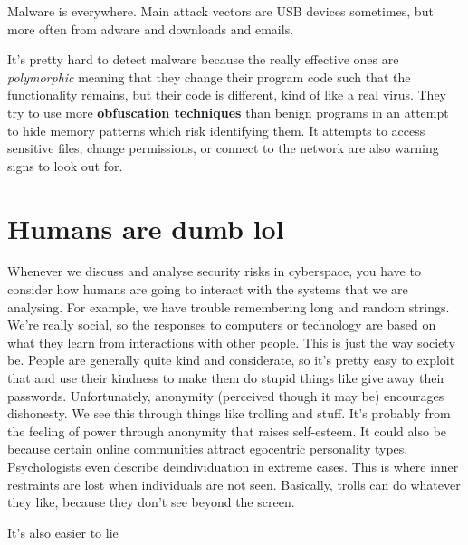 \documentclass[11pt,a4paper,titlepage]{scrartcl}
\begin{document}
Malware is everywhere. Main attack vectors are USB devices sometimes, but
more often from adware and downloads and emails.

It's pretty hard to detect malware because the really effective ones are
\textit{polymorphic} meaning that they change their program code such that
the functionality remains, but their code is different, kind of like a
real virus. They try to use more \textbf{obfuscation techniques} than
benign programs in an attempt to hide memory patterns which risk
identifying them. It attempts to access sensitive files, change
permissions, or connect to the network are also warning signs to look out
for. 

\section{Humans are dumb lol}%
\label{sec:dumb-humans}

Whenever we discuss and analyse security risks in cyberspace, you have to
consider how humans are going to interact with the systems that we are
analysing. For example, we have trouble remembering long and random
strings. We're really social, so the responses to computers or technology
are based on what they learn from interactions with other people. This is
just the way society be. People are generally quite kind and considerate,
so it's pretty easy to exploit that and use their kindness to make them do
stupid things like give away their passwords. Unfortunately, anonymity
(perceived though it may be) encourages dishonesty. We see this through
things like trolling and stuff. It's probably from the feeling of power
through anonymity that raises self-esteem. It could also be because
certain online communities attract egocentric personality types.
Psychologists even describe deindividuation in extreme cases. This is
where inner restraints are lost when individuals are not seen. Basically,
trolls can do whatever they like, because they don't see beyond the
screen. 

It's also easier to lie 
\end{document}
